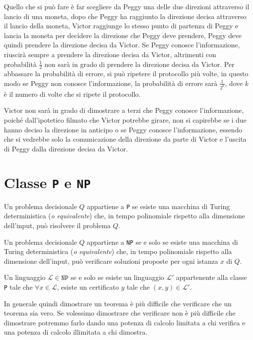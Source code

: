 Quello che si può fare è far scegliere da Peggy una delle due direzioni attraverso il lancio 
di una moneta, dopo che Peggy ha raggiunto la direzione decisa attraverso il lancio della moneta,
Victor raggiunge lo stesso punto di partenza di Peggy e lancia 
la moneta per decidere la direzione che Peggy deve prendere, Peggy deve quindi prendere la direzione
decisa da Victor. Se Peggy conosce l'informazione, riuscirà sempre a prendere la direzione decisa
da Victor, altrimenti con probabilità $\frac{1}{2}$ non sarà in grado di prendere la direzione
decisa da Victor.
Per abbassare la probabilità di errore, si può ripetere il protocollo più volte, in questo modo
se Peggy non conosce l'informazione, la probabilità di errore sarà $\frac{1}{2^k}$, dove $k$ è il
numero di volte che si ripete il protocollo.

Victor non sarà in grado di dimostrare a terzi che Peggy conosce l'informazione, poiché dall'ipotetico 
filmato che Victor potrebbe girare, non si capirebbe se i due hanno deciso la direzione in anticipo
o se Peggy conosce l'informazione, essendo che si vedrebbe solo la comunicazione della direzione da parte di Victor e
l'uscita di Peggy dalla direzione decisa da Victor.
\section{Classe \texttt{P} e \texttt{NP}}
Un problema decisionale $Q$ appartiene a \texttt{P} se esiste una macchina di Turing
deterministica (\textit{o equivalente}) che, in tempo polinomiale rispetto alla dimensione dell'input,
può risolvere il problema $Q$.

Un problema decisionale $Q$ appartiene a \texttt{NP} se e solo se esiste una macchina di Turing deterministica
(\textit{o equivalente}) che, in tempo polinomiale rispetto alla dimensione dell'input, può verificare soluzioni
proposte per ogni istanza $x$ di $Q$. 

\begin{theorem}
    Un linguaggio $\mathcal{L} \in \texttt{NP}$ se e solo se esiste un linguaggio 
    $\mathcal{L'}$ appartenente alla classe \texttt{P} tale che $\forall x \in \mathcal{L}$, esiste
    un certificato $y$ tale che $(x,y) \in \mathcal{L'}$.
\end{theorem}
In generale quindi dimostrare un teorema è più difficile che verificare che un teorema sia vero.
Se volessimo dimostrare che verificare non è più difficile che dimostrare potremmo farlo dando una 
potenza di calcolo limitata a chi verifica e una potenza di calcolo illimitata a chi dimostra.
